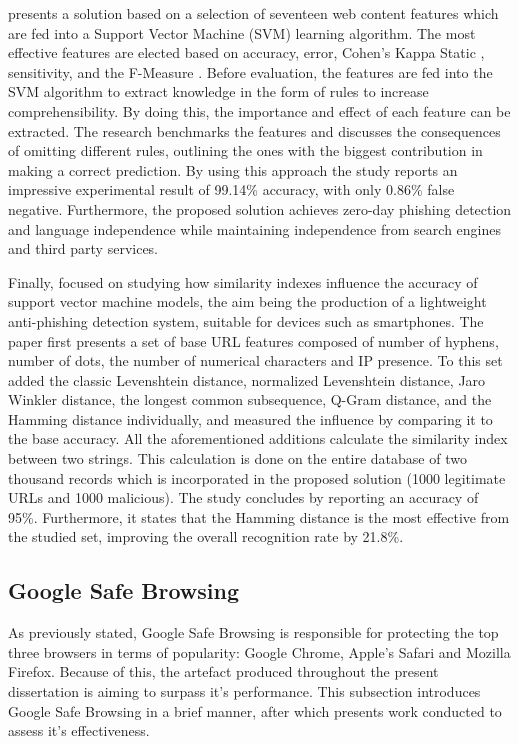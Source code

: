 \cite{SVM_ANTI_PHISHING} presents a solution based on a selection of seventeen
web content features which are fed into a Support Vector Machine (SVM) learning
algorithm. The most effective features are elected based on accuracy, error,
Cohen's Kappa Static \citep{DATA_MINING_T&T}, sensitivity, and the F-Measure
\citep{DATA_MINING_T&T}. Before evaluation, the features are fed into the SVM
algorithm to extract knowledge in the form of rules to increase
comprehensibility. By doing this, the importance and effect of each feature can
be extracted. The research benchmarks the features and discusses the
consequences of omitting different rules, outlining the ones with the biggest
contribution in making a correct prediction.
By using this approach the study reports an impressive experimental result of
99.14\% accuracy, with only 0.86\% false negative. Furthermore, the proposed
solution achieves zero-day phishing detection and language independence while
maintaining independence from search engines and third party services.

Finally, \cite{SVM_SIMILARITY_INDEX} focused on studying how similarity indexes
influence the accuracy of support vector machine models, the aim being the
production of a lightweight anti-phishing detection system, suitable for devices
such as smartphones. The paper first presents a set of base URL features
composed of number of hyphens, number of dots, the number of numerical
characters and IP presence. To this set \cite{SVM_SIMILARITY_INDEX} added the
classic Levenshtein distance, normalized Levenshtein distance, Jaro Winkler
distance, the longest common subsequence, Q-Gram distance, and the Hamming
distance individually, and measured the influence by comparing it to the base
accuracy. All the aforementioned additions calculate the similarity index
between two strings. This calculation is done on the entire database of two
thousand records which is incorporated in the proposed solution (1000 legitimate
URLs and 1000 malicious). The study concludes by reporting an accuracy of 95\%.
Furthermore, it states that the Hamming distance is the most effective from the
studied set, improving the overall recognition rate by 21.8\%.

\subsection{Google Safe Browsing}
As previously stated, Google Safe Browsing is responsible for protecting the top three browsers in terms of popularity: Google Chrome, Apple's Safari and Mozilla Firefox. Because of this, the artefact produced throughout the present dissertation is aiming to surpass it's performance. This subsection introduces Google Safe Browsing in a brief manner, after which presents work conducted to assess it's effectiveness.


